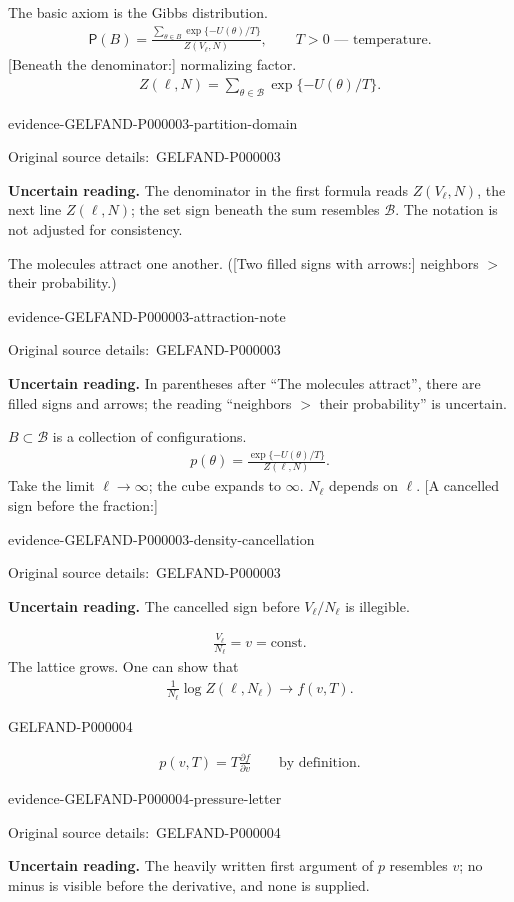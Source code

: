 \documentclass[11pt]{article}
\newcommand{\SourcePage}[2]{\par\smallskip\phantomsection\label{#1:source-page}{\small\sffamily\color{blue!55!black}#1}\par\smallskip}
\newcommand{\EvidenceBlock}[4]{%
 \par\smallskip\noindent\begin{minipage}{\linewidth}
 \begin{minipage}[t]{.47\linewidth}\vspace{0pt}\centering
 \csname evidence-#1-#2\endcsname\par
 {\scriptsize\SourceCropCaption\ #1}\par
 \end{minipage}\hfill
 \begin{minipage}[t]{.49\linewidth}\vspace{0pt}\raggedright
 {\small\color{orange!65!black}\textbf{#4} #3}\par
 \end{minipage}
 \end{minipage}\par\smallskip}
\newcommand{\Unclear}[3]{\EvidenceBlock{#1}{#2}{#3}{\ReadingCaption}}
\newcommand{\SourceCropCaption}{Original source details:}\newcommand{\ReadingCaption}{Uncertain reading.}\newcommand{\IncompleteCaption}{Undeciphered passage.}\newcommand{\DiagramCaption}{Diagram and typed description.}
\begin{document}
The basic axiom is the Gibbs distribution.
\begin{gather*}
 \mathsf{P}(B)=
 \frac{\displaystyle\sum_{\theta\in B}\exp\{-U(\theta)/T\}}
 {Z(V_\ell,N)},\qquad T>0\text{ --- temperature.}
\end{gather*}
[Beneath the denominator:] normalizing factor.
\begin{gather*}
 Z(\ell,N)=\sum_{\theta\in\mathcal{B}}\exp\{-U(\theta)/T\}.
\end{gather*}
\Unclear{GELFAND-P000003}{partition-domain}{The denominator in the first formula reads $Z(V_\ell,N)$, the next line $Z(\ell,N)$; the set sign beneath the sum resembles $\mathcal{B}$. The notation is not adjusted for consistency.}

The molecules attract one another.
([Two filled signs with arrows:] neighbors $>$ their probability.)
\Unclear{GELFAND-P000003}{attraction-note}{In parentheses after ``The molecules attract'', there are filled signs and arrows; the reading ``neighbors $>$ their probability'' is uncertain.}
$B\subset\mathcal{B}$ is a collection of configurations.
\begin{gather*}
 p(\theta)=\frac{\exp\{-U(\theta)/T\}}{Z(\ell,N)}.
\end{gather*}
Take the limit $\ell\to\infty$; the cube expands to $\infty$.
$N_\ell$ depends on $\ell$.
[A cancelled sign before the fraction:]
\Unclear{GELFAND-P000003}{density-cancellation}{The cancelled sign before $V_\ell/N_\ell$ is illegible.}
\begin{gather*}
 \frac{V_\ell}{N_\ell}=v=\mathrm{const}.
\end{gather*}
The lattice grows.
One can show that
\begin{gather*}
 \frac1{N_\ell}\log Z(\ell,N_\ell)\longrightarrow f(v,T).
\end{gather*}

\SourcePage{GELFAND-P000004}{unlabelled}
\begin{gather*}
 p(v,T)=T\frac{\partial f}{\partial v}\qquad\text{by definition.}
\end{gather*}
\Unclear{GELFAND-P000004}{pressure-letter}{The heavily written first argument of $p$ resembles $v$; no minus is visible before the derivative, and none is supplied.}
\end{document}
